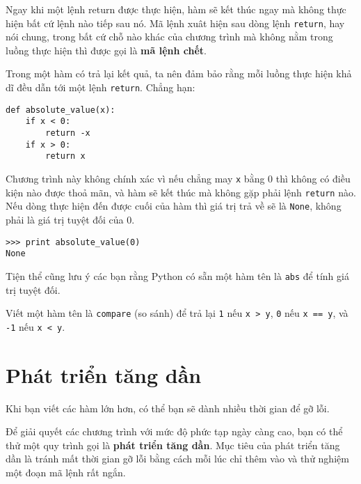 \documentclass[11pt]{book}
\begin{document}
Ngay khi một lệnh return được thực hiện, hàm sẽ kết thúc ngay mà
không thực hiện bất cứ lệnh nào tiếp sau nó. Mã lệnh xuât hiện sau
dòng lệnh {\tt return}, hay nói chung, trong bất cứ chỗ nào khác của
chương trình mà không nằm trong luồng thực hiện thì được gọi là 
{\bf mã lệnh chết}.


Trong một hàm có trả lại kết quả, ta nên đảm bảo rằng mỗi luồng thực
hiện khả dĩ đều dẫn tới một lệnh
{\tt return}. Chẳng hạn:

\beforeverb
\begin{verbatim}
def absolute_value(x):
    if x < 0:
        return -x
    if x > 0:
        return x
\end{verbatim}
\afterverb
%
Chương trình này không chính xác vì nếu chẳng may {\tt x} bằng 0
thì không có điều kiện nào được thoả mãn, và hàm sẽ kết thúc 
mà không gặp phải lệnh {\tt return} nào. Nếu dòng thực hiện 
đến được cuối của hàm thì giá trị trả về sẽ là {\tt None}, không phải
là giá trị tuyệt đối của 0.


\beforeverb
\begin{verbatim}
>>> print absolute_value(0)
None
\end{verbatim}
\afterverb
%
Tiện thể cũng lưu ý các bạn rằng Python có sẵn một
hàm tên là {\tt abs} để tính giá trị tuyệt đối.


\begin{ex}


Viết một hàm tên là {\tt compare} (so sánh)
để trả lại {\tt 1} nếu {\tt x > y},
{\tt 0} nếu {\tt x == y}, và {\tt -1} nếu {\tt x < y}.
\end{ex}


\section{Phát triển tăng dần}
\label{incremental development}


Khi bạn viết các hàm lớn hơn, có thể bạn sẽ dành nhiều thời gian để
gỡ lỗi.

Để giải quyết các chương trình với mức độ phức tạp ngày càng cao,
bạn có thể thử một quy trình gọi là {\bf phát triển tăng dần}.
Mục tiêu của phát triển tăng dần là tránh mất thời gian gỡ lỗi bằng
cách mỗi lúc chỉ thêm vào và thử nghiệm một đoạn mã lệnh rất ngắn.
\end{document}
